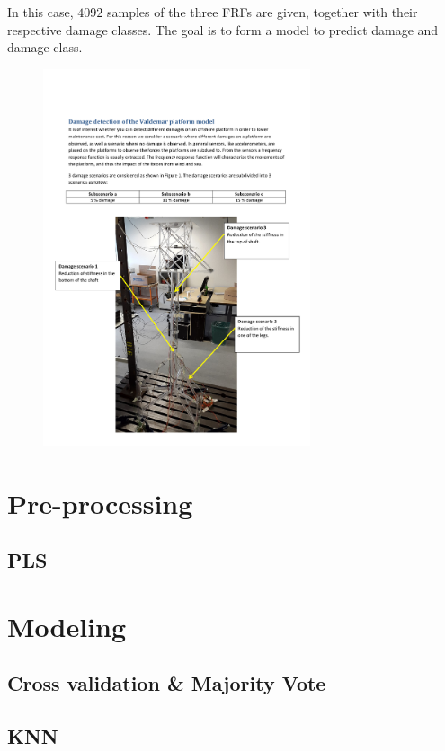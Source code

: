 \documentclass[a4paper,draft=false]{scrreprt}
\begin{document}
In this case, $4092$ samples of the three FRFs are given, together with their respective damage classes. The goal is to form a model to predict damage and damage class.

\begin{figure}[hb]
\begin{center}
\includegraphics[width=0.7\textwidth]{Valdemarplatform}
\end{center}
\end{figure}

\chapter{Pre-processing}
\section{PLS} %

\chapter{Modeling}
\section{Cross validation \& Majority Vote} %
\section{KNN} %
\end{document}
